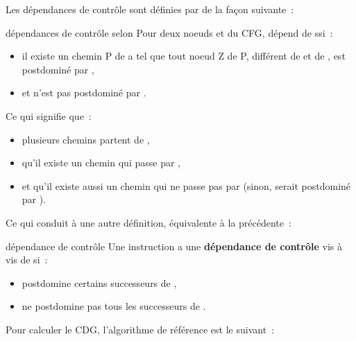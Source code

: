 Les dépendances de contrôle sont définies par \cite{Ferrante87}
de la façon suivante~:

\begin{definition}{dépendances de contrôle selon \cite{Ferrante87}}
  Pour deux noeuds  et  du CFG,  dépend de  ssi~:
\begin{itemize}
  \item il existe un chemin P de  a 
    tel que tout noeud Z de P, différent de  et de , est postdominé
    par ,
  \item et  n'est pas postdominé par .
\end{itemize}
\end{definition}

Ce qui signifie que~:
\begin{itemize}
  \item plusieurs chemins partent de ,
  \item qu'il existe un chemin qui passe par ,
  \item et qu'il existe aussi un chemin qui ne passe pas par 
    (sinon,  serait postdominé par ).
\end{itemize}

Ce qui conduit à une autre
définition, équivalente à la précédente~:

\begin{definition}{dépendance de contrôle}
  Une instruction  a une {\bf dépendance de contrôle} vis à vis de  si~:
\begin{itemize}
  \item {} postdomine certains successeurs de ,
  \item {} ne postdomine pas tous les successeurs de .
\end{itemize}
\end{definition}

Pour calculer le CDG, l'algorithme de référence est le suivant~:

